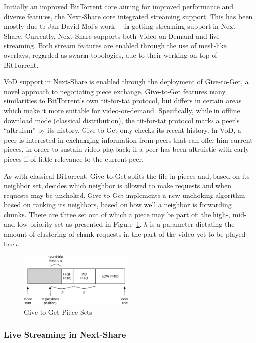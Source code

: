 Initially an improved BitTorrent core aiming for improved performance and
diverse features, the Next-Share core integrated streaming support. This has
been mostly due to Jan David Mol's
work~\cite{give-to-get}~\cite{design-p2p-live} in getting streaming
support in Next-Share. Currently, Next-Share supports both Video-on-Demand
and live streaming. Both stream features are enabled through the use of
mesh-like overlays, regarded as swarm topologies, due to their working on top
of BitTorrent.

VoD support in Next-Share is enabled through the deployment of Give-to-Get, a
novel approach to negotiating piece exchange. Give-to-Get features many
similarities to BitTorrent's own tit-for-tat protocol, but differs in certain
areas which make it more suitable for video-on-demand. Specifically, while in
offline download mode (classical distribution), the tit-for-tat protocol marks
a peer's ``altruism'' by its history, Give-to-Get only checks its recent
history. In VoD, a peer is interested in exchanging information from peers that
can offer him current pieces, in order to sustain video playback; if a peer
has been altruistic with early pieces if of little relevance to the current
peer.

As with classical BiTorrent, Give-to-Get splits the file in pieces and, based
on its neighbor set, decides which neighbor is allowed to make requests and
when requests may be unchoked. Give-to-Get implements a new unchoking
algorithm based on ranking its neighbors, based on how well a neighbor is
forwarding chunks. There are three set out of which a piece may be part of:
the high-, mid- and low-priority set as presented in
Figure~\ref{fig:multimedia-dist:gtg-sets}. \textit{h} is a parameter dictating the amount of
clustering of chunk requests in the part of the video yet to be played back.

\begin{figure}
  \centering
  \includegraphics[width=0.5\textwidth]{src/img/multimedia-dist/gtg-sets}
  \caption{Give-to-Get Piece Sets~\cite{give-to-get}}
  \label{fig:multimedia-dist:gtg-sets}
\end{figure}

\subsubsection{Live Streaming in Next-Share}

